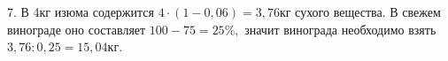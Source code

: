 7. В 4кг изюма содержится $4\cdot(1-0,06)=3,76$кг сухого вещества. В свежем винограде оно составляет $100-75=25\%,$ значит винограда необходимо взять $3,76:0,25=15,04$кг.\\
